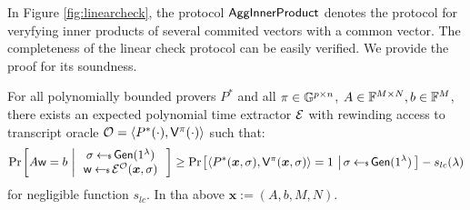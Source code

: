 In Figure \ref{fig:linearcheck}, the protocol $\mathsf{AggInnerProduct}$ denotes the protocol for veryfying inner
products of several commited vectors with a common vector. The completeness of
the linear check protocol can be easily verified. We provide the proof for its
soundness.
\begin{lemma}[Soundness]\label{lem:linercheck_sound}
For all polynomially bounded provers $P^\ast$ and all $\pi\in \mathbb{G}^{p\times n}$,
$A\in \mathbb{F}^{M\times N}, b\in \mathbb{F}^M$, there exists an expected polynomial time
extractor $\mathcal{E}$ with rewinding access to transcript oracle $\mathcal{O}=\langle
P^\ast(\cdot),\mathsf{V}^\pi(\cdot)\rangle$ such that:
\begin{align*}
\condprob{A\wit = b}{
\begin{array}{c}
\sigma\sample \gen(\secparam) \\
\wit\sample \extr^{\mc{O}}(\bm{x},\sigma)
\end{array}}\geq
\condprob{\innp{P^\ast(\bm{x},\sigma)}{\verifier^\pi(\bm{x},\sigma)}=1}
{\sigma\sample\gen(\secparam)}-s_{lc}(\secpar)
\end{align*}
for negligible function $s_{lc}$. In tha above $\bm{x} := (A,b,M,N)$.
\end{lemma}
